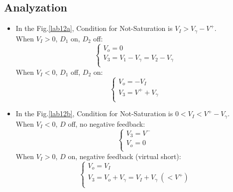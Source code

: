     \subsection{Analyzation}
    \begin{itemize}
        \item In the Fig.\ref{lab12a}, Condition for Not-Saturation is $V_I>V_\gamma-V^+$.\\
            When $V_I>0$, $D_1$ on, $D_2$ off:\\
            \begin{equation}
                \begin{cases}
                    V_o = 0\\
                    V_3 = V_1 - V_\gamma = V_2 - V_\gamma\\
                \end{cases}
            \end{equation}
            When $V_I<0$, $D_1$ off, $D_2$ on:\\
            \begin{equation}
                \begin{cases}
                    V_o = -V_I\\
                    V_3 = V^+ + V_\gamma\\
                \end{cases}
            \end{equation}
        \item In the Fig.\ref{lab12b}, Condition for Not-Saturation is $0<V_I<V^+-V_\gamma$.\\
            When $V_I<0$, $D$ off, no negative feedback:\\
                \begin{equation}
                    \begin{cases}
                        V_3 = V^-\\
                        V_o = 0\\
                    \end{cases}
                \end{equation}
            When $V_I>0$, $D$ on, negative feedback (virtual short):\\
                \begin{equation}
                    \begin{cases}
                        V_o = V_I\\
                        V_3 = V_o + V_\gamma = V_I+ V_\gamma ~(<V^+)\\
                    \end{cases}
                \end{equation}
    \end{itemize}
